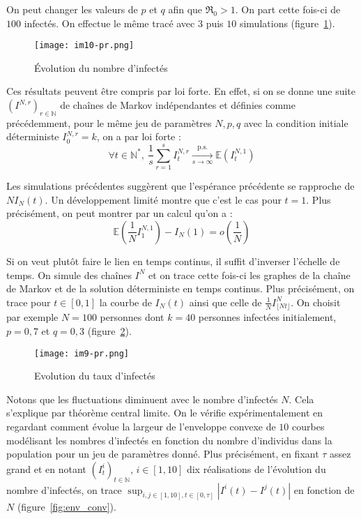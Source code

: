 \documentclass[a4paper,10.9pt]{article}
\begin{document}
On peut changer les valeurs de $p$ et $q$ afin que $\mathfrak{R}_0>1$. On part cette fois-ci de $100$ infectés. On effectue le même tracé avec $3$ puis $10$ simulations (figure~\ref{fig:nb_inf2}).

\begin{figure}[h!]
  \centering
  \texttt{[image: im10-pr.png]} %
  \caption{Évolution du nombre d'infectés}
  \label{fig:nb_inf2}
\end{figure}

Ces résultats peuvent être compris par loi forte. En effet, si on se donne une suite $(I^{N,r})_{r\in \mathbb{N}}$ de chaînes de Markov indépendantes et définies comme précédemment, pour le même jeu de paramètres $N, p, q$ avec la condition initiale déterministe $I^{N,r}_{0}=k$, on a par loi forte :
$$\forall t\in \mathbb{N}^*, \ \frac{1}{s} \sum_{r=1}^s I^{N,r}_t \xrightarrow[s \to \infty]{\text{p.s.}} \mathbb{E}(I^{N,1}_t)$$

Les simulations précédentes suggèrent que l'espérance précédente se rapproche de $N I_N(t)$. Un développement limité montre que c'est le cas pour $t=1$. Plus précisément, on peut montrer par un calcul qu'on a :
$$\mathbb{E} \left( \frac{1}{N}I^{N,1}_1 \right)-I_N(1) = o \left(\frac{1}{N} \right)$$

Si on veut plutôt faire le lien en temps continus, il suffit d'inverser l'échelle de temps. On simule des chaînes $I^N$ et on trace cette fois-ci les graphes de la chaîne de Markov et de la solution déterministe en temps continus. Plus précisément, on trace pour $t \in [0,1]$ la courbe de $I_N(t)$ ainsi que celle de $\frac{1}{N} I^N_{\lfloor Nt \rfloor}$. On choisit par exemple $N=100$ personnes dont $k=40$ personnes infectées initialement, $p=0,7$ et $q=0,3$ (figure~\ref{fig:taux_inf_lien}). \\

\begin{figure}[h!]
  \centering
  \texttt{[image: im9-pr.png]} %
  \caption{Evolution du taux d'infectés}
  \label{fig:taux_inf_lien}
\end{figure}

Notons que les fluctuations diminuent avec le nombre d'infectés $N$. Cela s'explique par théorème central limite. On le vérifie expérimentalement en regardant comment évolue la largeur de l'enveloppe convexe de $10$ courbes modélisant les nombres d'infectés en fonction du nombre d'individus dans la population pour un jeu de paramètres donné. Plus précisément, en fixant $\tau$ assez grand et en notant $(I^i_t)_{t \in \mathbb{N}}$, $i \in [1,10]$ dix réalisations de l'évolution du nombre d'infectés, on trace $\sup_{i,j \in [1,10], t \in [0,\tau]} |I^i(t)-I^j(t)|$ en fonction de $N$ (figure~\ref{fig:env_conv}). 
\end{document}

